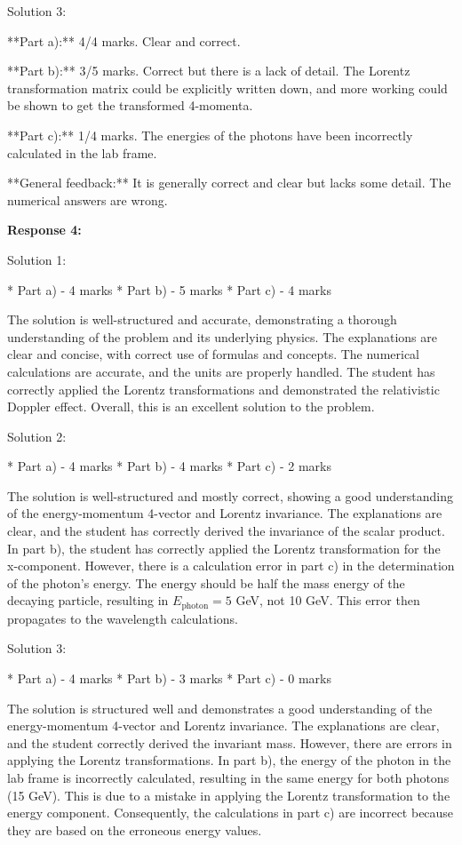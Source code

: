 \documentclass[a4paper,11pt]{article}
\begin{document}
Solution 3:

**Part a):** 4/4 marks. Clear and correct.

**Part b):** 3/5 marks. Correct but there is a lack of detail. The Lorentz transformation matrix could be explicitly written down, and more working could be shown to get the transformed 4-momenta.

**Part c):** 1/4 marks. The energies of the photons have been incorrectly calculated in the lab frame.

**General feedback:** It is generally correct and clear but lacks some detail. The numerical answers are wrong.

\bigskip    
\textbf{Response 4:}

Solution 1:

*   Part a) - 4 marks
*   Part b) - 5 marks
*   Part c) - 4 marks

The solution is well-structured and accurate, demonstrating a thorough understanding of the problem and its underlying physics. The explanations are clear and concise, with correct use of formulas and concepts. The numerical calculations are accurate, and the units are properly handled. The student has correctly applied the Lorentz transformations and demonstrated the relativistic Doppler effect. Overall, this is an excellent solution to the problem.

Solution 2:

*   Part a) - 4 marks
*   Part b) - 4 marks
*   Part c) - 2 marks

The solution is well-structured and mostly correct, showing a good understanding of the energy-momentum 4-vector and Lorentz invariance. The explanations are clear, and the student has correctly derived the invariance of the scalar product. In part b), the student has correctly applied the Lorentz transformation for the x-component. However, there is a calculation error in part c) in the determination of the photon's energy. The energy should be half the mass energy of the decaying particle, resulting in \(E_{\text{photon}} = 5\) GeV, not 10 GeV. This error then propagates to the wavelength calculations.

Solution 3:

*   Part a) - 4 marks
*   Part b) - 3 marks
*   Part c) - 0 marks

The solution is structured well and demonstrates a good understanding of the energy-momentum 4-vector and Lorentz invariance. The explanations are clear, and the student correctly derived the invariant mass. However, there are errors in applying the Lorentz transformations. In part b), the energy of the photon in the lab frame is incorrectly calculated, resulting in the same energy for both photons (15 GeV). This is due to a mistake in applying the Lorentz transformation to the energy component. Consequently, the calculations in part c) are incorrect because they are based on the erroneous energy values.
\end{document}
